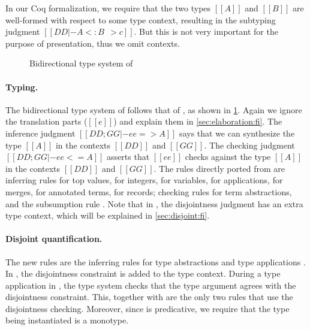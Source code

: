 \begin{remark}
  In our Coq formalization, we require that the two types $[[A]]$ and $[[B]]$ are
  well-formed with respect to some type context, resulting in the subtyping
  judgment $[[DD |- A <: B ~~> c]]$. But this is not very important
  for the purpose of presentation, thus we omit contexts.
\end{remark}


\begin{figure}[t]
  \centering
  \caption{Bidirectional type system of \fnamee}
  \label{fig:typing:fi}
\end{figure}


\paragraph{Typing.}

The bidirectional type system of \fnamee follows that of \fname, as shown
in \cref{fig:typing:fi}. Again we ignore the translation parts ($[[e]]$) and explain them in
\cref{sec:elaboration:fi}. The inference judgment $[[ DD; GG |- ee => A  ]]$
says that we can synthesize the type $[[A]]$ in the contexts $[[DD]]$ and $[[GG]]$. The checking judgment
$[[ DD ; GG |- ee <= A  ]]$ asserts that $[[ee]]$ checks against the type $[[A]]$
in the contexts $[[DD]]$ and $[[GG]]$. The rules directly ported from \namee are inferring rules  for top values,
 for integers,  for variables,  for applications,  for merges,
 for annotated terms,  for records; checking rules  for term abstractions, and
the subsumption rule . Note that in , the disjointness judgment has an extra type context, which will be
explained in \cref{sec:disjoint:fi}.

\paragraph{Disjoint quantification.}

The new rules are the inferring rules for type abstractions  and
type applications . In , the disjointness
constraint is added to the type context. During a type application in
, the type system checks that the type argument agrees with the
disjointness constraint. This, together with  are the only two
rules that use the disjointness checking. Moreover, since \fnamee is
predicative, we require that the type being instantiated is a monotype.



